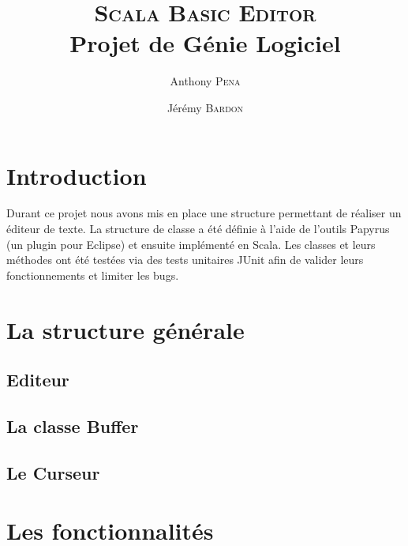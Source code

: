\documentclass[french]{article}
\author{Anthony \textsc{Pena} \and Jérémy \textsc{Bardon}}
\title{\textsc{Scala Basic Editor}\\\normalsize{Projet de Génie Logiciel}}
\date{}
\begin{document}
\maketitle

\renewcommand\contentsname{Sommaire}
\tableofcontents



\section{Introduction}

Durant ce projet nous avons mis en place une structure permettant de réaliser un éditeur de texte. La structure de classe a été définie à l'aide de l'outils Papyrus (un plugin pour Eclipse) et ensuite implémenté en Scala. Les classes et leurs méthodes ont été testées via des tests unitaires JUnit afin de valider leurs fonctionnements et limiter les bugs.

\section{La structure générale}

\subsection{Editeur}

\subsection{La classe Buffer}

\subsection{Le Curseur}

\section{Les fonctionnalités}

\end{document}
